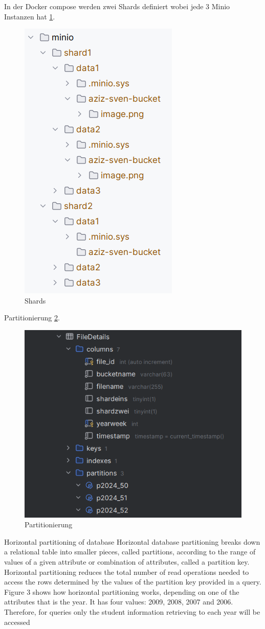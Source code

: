 \documentclass[12pt]{report}
\begin{document}
			In der Docker compose werden zwei Shards definiert wobei jede 3 Minio Instanzen hat \ref{fig:shards}. 
		
			\begin{figure}[h]
				\centering
				\includegraphics[width=0.4\linewidth]{shards}
				\caption{Shards}
				\label{fig:shards}
			\end{figure}
			
			Partitionierung \ref{fig:partitionierung}.
			
			\begin{figure}[h]
				\centering
				\includegraphics[width=0.8\linewidth]{partitionierung}
				\caption{Partitionierung}
				\label{fig:partitionierung}
			\end{figure}
			
			Horizontal partitioning of
			database
			Horizontal database partitioning breaks down
			a relational table into smaller pieces, called
			partitions, according to the range of values of
			a given attribute or combination of attributes,
			called a partition key. Horizontal partitioning
			reduces the total number of read operations
			needed to access the rows determined by the
			values of the partition key provided in a
			query. Figure 3 shows how horizontal
			partitioning works, depending on one of the
			attributes that is the year.
			It has four values: 2009, 2008, 2007 and
			2006. Therefore, for queries only the student
			information retrieving to each year will be
			accessed \cite{alsultanny2010database}
			
\end{document}
